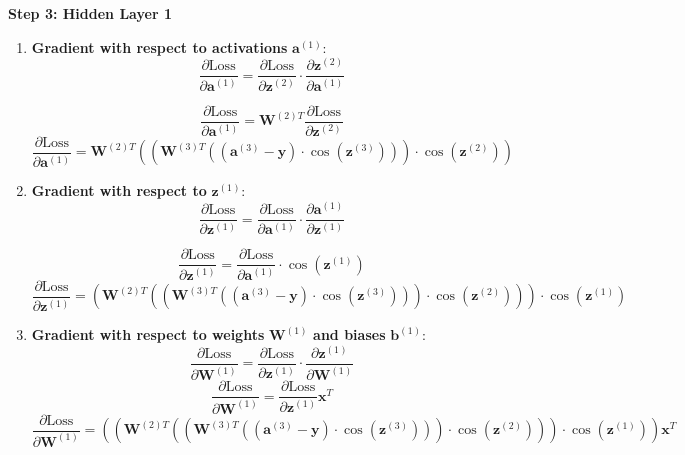 \textbf{Step 3: Hidden Layer 1}
\begin{enumerate}[label=\textbf{\roman*.}]
  \item \textbf{Gradient with respect to activations} $\mathbf{a}^{(1)}$:
      \[
  \frac{\partial \text{Loss}}{\partial \mathbf{a}^{(1)}} = \frac{\partial \text{Loss}}{\partial \mathbf{z}^{(2)}} \cdot \frac{\partial \mathbf{z}^{(2)}}{\partial \mathbf{a}^{(1)}}
  \]
  
  \[
  \frac{\partial \text{Loss}}{\partial \mathbf{a}^{(1)}} = \mathbf{W}^{(2)T} \frac{\partial \text{Loss}}{\partial \mathbf{z}^{(2)}}
  \]
  \begin{equation}
  \frac{\partial \text{Loss}}{\partial \mathbf{a}^{(1)}} = \mathbf{W}^{(2)T} \left(\left(\mathbf{W}^{(3)T} \left((\mathbf{a}^{(3)} - \mathbf{y}) \cdot \cos(\mathbf{z}^{(3)})\right)\right) \cdot \cos(\mathbf{z}^{(2)})\right)
  \end{equation}

  \item \textbf{Gradient with respect to} $\mathbf{z}^{(1)}$:
    \[
  \frac{\partial \text{Loss}}{\partial \mathbf{z}^{(1)}} = \frac{\partial \text{Loss}}{\partial \mathbf{a}^{(1)}} \cdot \frac{\partial \mathbf{a}^{(1)}}{\partial \mathbf{z}^{(1)}}
  \]

  \[
  \frac{\partial \text{Loss}}{\partial \mathbf{z}^{(1)}} = \frac{\partial \text{Loss}}{\partial \mathbf{a}^{(1)}} \cdot \cos(\mathbf{z}^{(1)})
  \]
  \begin{equation}
  \frac{\partial \text{Loss}}{\partial \mathbf{z}^{(1)}} = \left(\mathbf{W}^{(2)T} \left(\left(\mathbf{W}^{(3)T} \left((\mathbf{a}^{(3)} - \mathbf{y}) \cdot \cos(\mathbf{z}^{(3)})\right)\right) \cdot \cos(\mathbf{z}^{(2)})\right)\right) \cdot \cos(\mathbf{z}^{(1)})
  \end{equation}

  \item \textbf{Gradient with respect to weights} $\mathbf{W}^{(1)}$ \textbf{and biases} $\mathbf{b}^{(1)}$:
       \[
  \frac{\partial \text{Loss}}{\partial \mathbf{W}^{(1)}} = \frac{\partial \text{Loss}}{\partial \mathbf{z}^{(1)}} \cdot \frac{\partial \mathbf{z}^{(1)}}{\partial \mathbf{W}^{(1)}}
  \]
  \[
  \frac{\partial \text{Loss}}{\partial \mathbf{W}^{(1)}} = \frac{\partial \text{Loss}}{\partial \mathbf{z}^{(1)}} \mathbf{x}^T
  \]
  \begin{equation}
  \frac{\partial \text{Loss}}{\partial \mathbf{W}^{(1)}} = \left(\left(\mathbf{W}^{(2)T} \left(\left(\mathbf{W}^{(3)T} \left((\mathbf{a}^{(3)} - \mathbf{y}) \cdot \cos(\mathbf{z}^{(3)})\right)\right) \cdot \cos(\mathbf{z}^{(2)})\right)\right) \cdot \cos(\mathbf{z}^{(1)})\right) \mathbf{x}^T
  \end{equation}


\end{enumerate}
